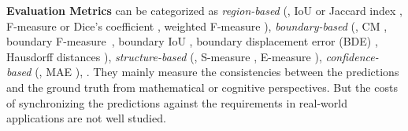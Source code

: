 \documentclass[10pt,twocolumn,letterpaper]{article}
\begin{document}
\noindent\textbf{Evaluation Metrics} can be categorized as \textit{region-based} (\eg, IoU or Jaccard index \cite{IoUJaccard}, F-measure \cite{DBLP:conf/muc/Chinchor92,Rijsbergen1979} or Dice's coefficient \cite{Thorvald1948}, weighted F-measure \cite{Margolin2014HowTE}), \textit{boundary-based} (\eg, CM \cite{movahedi2010design}, boundary F-measure~\cite{DBLP:journals/pami/MartinFM04,perazzi2016benchmark,ehrig2005relaxed,mnih2010learning,saito2016multiple,zhang2018road,qin2019basnet}, boundary IoU \cite{cheng2021boundary}, boundary displacement error (BDE) \cite{DBLP:conf/eccv/FreixenetMRMC02}, Hausdorff distances \cite{Hausdorff1914,Henry1920,DBLP:conf/ifip7/BirsanT05}), \textit{structure-based} (\eg, S-measure \cite{fan2017structure}, E-measure \cite{fan2018enhanced,fan2021cognitive}), \textit{confidence-based} (\eg, MAE \cite{perazzi2012saliency}), \etc. They mainly measure the consistencies between the predictions and the ground truth from mathematical or cognitive perspectives. But the costs of synchronizing the predictions against the requirements in real-world applications are not well studied. 
\end{document}
